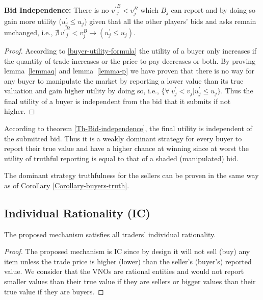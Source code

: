 \begin{Theorem}\textbf{{Bid Independence:}} There is no ${v^\prime}^B_{j} < v^B_{j}$ which $B_{j}$ can report and by doing so gain more utility (${u_{j}^\prime} \leq u_{j}$) given that all the other players' bids and asks remain unchanged, i.e., $\nexists \ {{v^\prime}^B_{j} < v^B_{j}}\rightarrow ({u_{j}^\prime} \leq u_{j})$.
\label{Th-Bid-independence}
\end{Theorem}
\begin{proof}
According to \autoref{buyer-utility-formula} the utility of a buyer only increases if the quantity of trade increases or the price to pay decreases or both. By proving lemma~\ref{lemmaq} and lemma~\ref{lemma-p} we have proven that there is no way for any buyer to manipulate the market by reporting a lower value than its true valuation and gain higher utility by doing so, i.e., $\{\forall \ v^\prime_j < v_j | u^\prime_{j} \leq u_{j} \}$. Thus the final utility of a buyer is independent from the bid that it submits if not higher.
\end{proof}

\begin{Corollary}
According to theorem \ref{Th-Bid-independence}, the final utility is independent of the submitted bid. Thus it is a weakly dominant strategy for every buyer to report their true value and have a higher chance at winning since at worst the utility of truthful reporting is equal to that of a shaded (manipulated) bid.
\label{Corollary-buyers-truth}
\end{Corollary}
\begin{Corollary}
The dominant strategy truthfulness for the sellers can be proven in the same way as of Corollary \ref{Corollary-buyers-truth}.
\label{Corollary-sellers-truth}
\end{Corollary}

\subsection{Individual Rationality (IC)}
\begin{Theorem}
The proposed mechanism satisfies all traders' individual rationality.
\end{Theorem}
\begin{proof}
The proposed mechanism is \ac{IC} since by design it will not sell (buy) any item unless the trade price is higher (lower) than the seller's (buyer's) reported value. We consider that the \acp{VNO} are rational entities and would not report smaller values than their true value if they are sellers or bigger values than their true value if they are buyers.
\end{proof}

